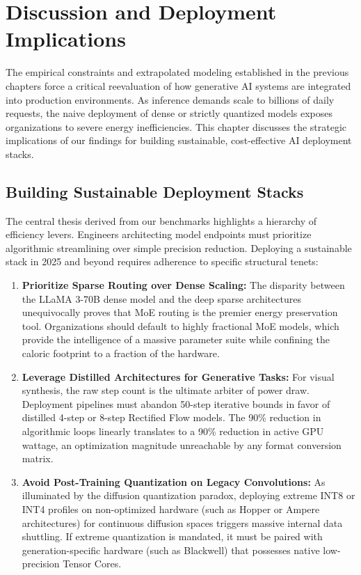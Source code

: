 \documentclass[12pt, a4paper]{report}
\begin{document}
\chapter{Discussion and Deployment Implications}
\label{ch:discussion}

The empirical constraints and extrapolated modeling established in the previous chapters force a critical reevaluation of how generative AI systems are integrated into production environments. As inference demands scale to billions of daily requests, the naive deployment of dense or strictly quantized models exposes organizations to severe energy inefficiencies. This chapter discusses the strategic implications of our findings for building sustainable, cost-effective AI deployment stacks.

\section{Building Sustainable Deployment Stacks}
The central thesis derived from our benchmarks highlights a hierarchy of efficiency levers. Engineers architecting model endpoints must prioritize algorithmic streamlining over simple precision reduction. Deploying a sustainable stack in 2025 and beyond requires adherence to specific structural tenets:

\begin{enumerate}
    \item \textbf{Prioritize Sparse Routing over Dense Scaling:} The disparity between the LLaMA 3-70B dense model and the deep sparse architectures unequivocally proves that MoE routing is the premier energy preservation tool. Organizations should default to highly fractional MoE models, which provide the intelligence of a massive parameter suite while confining the caloric footprint to a fraction of the hardware.
    
    \item \textbf{Leverage Distilled Architectures for Generative Tasks:} For visual synthesis, the raw step count is the ultimate arbiter of power draw. Deployment pipelines must abandon 50-step iterative bounds in favor of distilled 4-step or 8-step Rectified Flow models. The 90\% reduction in algorithmic loops linearly translates to a 90\% reduction in active GPU wattage, an optimization magnitude unreachable by any format conversion matrix.
    
    \item \textbf{Avoid Post-Training Quantization on Legacy Convolutions:} As illuminated by the diffusion quantization paradox, deploying extreme INT8 or INT4 profiles on non-optimized hardware (such as Hopper or Ampere architectures) for continuous diffusion spaces triggers massive internal data shuttling. If extreme quantization is mandated, it must be paired with generation-specific hardware (such as Blackwell) that possesses native low-precision Tensor Cores.
\end{enumerate}
\end{document}
